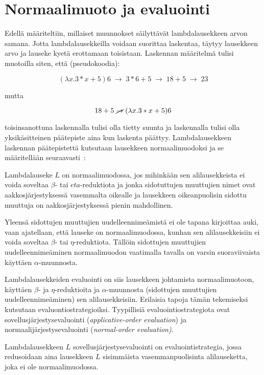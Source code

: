 \section{Normaalimuoto ja evaluointi}

Edellä määriteltiin, millaiset muunnokset säilyttävät lambdalausekkeen arvon samana. Jotta lambdalausekkeilla voidaan suorittaa laskentaa, täytyy lausekkeen arvo ja lauseke kyetä erottamaan toisistaan. Laskennan määritelmä tulisi muotoilla siten, että (pseudokoodia):

\[ 
(\lambda x. 3 * x + 5) 6 \; \rightarrow \; 3 * 6 + 5 \; \rightarrow \; 18 + 5 \; \rightarrow \; 23 
\]

mutta 

\[ 18 + 5 \; \cancel{\rightarrow} \; (\lambda x. 3 * x + 5) 6 \]

toisinsanottuna laskennalla tulisi olla tietty suunta ja laskennalla tulisi olla yksikäsitteinen päätepiste aina kun laskenta päättyy. Lambdalausekkeen laskennan päätepistettä kutsutaan lausekkeen normaalimuodoksi ja se määritellään seuraavasti~\cite[s.~9]{Hudak89}: 

\begin{maar}[normaalimuoto]
Lambdalauseke $L$ on normaalimuodossa, jos mihinkään sen alilausekkeista ei voida soveltaa $\beta$- tai $eta$-reduktiota ja jonka sidotuttujen muuttujien nimet ovat aakkosjärjestyksessä vasemmalta oikealle ja lausekkeen oikeanpuolisin sidottu muuttuja on aakkosjärjestyksessä pienin mahdollinen.  
\end{maar}

Yleensä sidottujen muuttujien uudelleennimeämistä ei ole tapana kirjoittaa auki, vaan ajatellaan, että lauseke on normaalimuodossa, kunhan sen alilausekkeisiin ei voida soveltaa $\beta$- tai $\eta$-reduktiota. Tällöin sidottujen muuttujien uudelleennimeäminen normaalimuodon vaatimalla tavalla on varsin suoraviivaista käyttäen $\alpha$-muunnosta.

\par

Lambdalausekkeiden evaluointi on siis lausekkeen johtamista normaalimuotoon, käyttäen $\beta$- ja $\eta$-reduktioita ja $\alpha$-muunnosta (sidottujen muuttujien uudelleennimeäminen) sen alilausekkeisiin. Erilaisia tapoja tämän tekemiseksi kutsutaan evaluontiostrategioiksi. Tyypillisiä evaluointiostrategiota ovat sovellusjärjestysevaluointi (\textit{applicative-order evaluation}) ja normaalijärjestysevaluointi (\textit{normal-order evaluation)}.

\begin{alg}[sovellusjärjestysevaluointi] 
Lambdalausekkeen $L$ sovellusjärjestysevaluointi on evaluointistrategia, jossa redusoidaan aina lausekkeen $L$ sisimmäista vasemmanpuolisinta alilauseketta, joka ei ole normaalimuodossa.
\end{alg}

